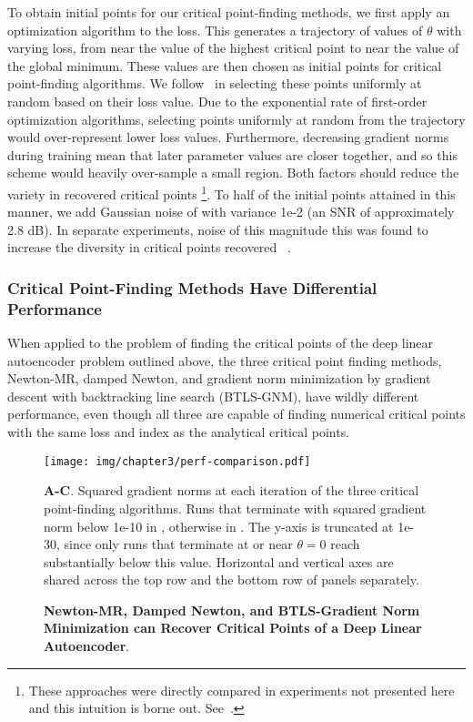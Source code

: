 \documentclass[../../thesis.tex]{subfiles}
\begin{document}
To obtain initial points for our critical point-finding methods,
we first apply an optimization algorithm to the loss.
This generates a trajectory of values of $\theta$ with varying loss,
from near the value of the highest critical point
to near the value of the global minimum.
These values are then chosen as initial points
for critical point-finding algorithms.
We follow~\cite{pennington2017} in selecting these points
uniformly at random based on their loss value.
Due to the exponential rate of first-order optimization algorithms,
selecting points uniformly at random from the trajectory
would over-represent lower loss values.
Furthermore, decreasing gradient norms during training mean that
later parameter values are closer together,
and so this scheme would heavily over-sample a small region.
Both factors should reduce the variety in recovered critical points%
\footnote{These approaches were directly compared in
experiments not presented here and this intuition is borne out.
See~\cite{frye2019}.}.
To half of the initial points attained in this manner,
we add Gaussian noise of with variance 1e-2
(an SNR of approximately 2.8 dB).
In separate experiments,
noise of this magnitude
this was found to increase
the diversity in critical points recovered%
~\cite{frye2019}.

\subsubsection{Critical Point-Finding Methods Have Differential Performance}%

When applied to the problem of finding the critical points
of the deep linear autoencoder problem outlined above,
the three critical point finding methods,
Newton-MR, damped Newton, and
gradient norm minimization by gradient descent with backtracking line search
(BTLS-GNM),
have wildly different performance,
even though all three are capable of finding numerical critical points
with the same loss and index as the analytical critical points.

\begin{figure}[h]
	\begin{center}
		\texttt{[image: img/chapter3/perf-comparison.pdf]}
	\end{center}
	\caption{\textbf{Newton-MR, Damped Newton, and BTLS-Gradient Norm Minimization
	can Recover Critical Points of a Deep Linear Autoencoder}.}{%
		\textbf{A-C}. Squared gradient norms at each iteration
		of the three critical point-finding algorithms.
		Runs that terminate with squared gradient norm below 1e-10
		in \successcolor{},
		otherwise in \failcolor{}.
		The y-axis is truncated at 1e-30,
		since only runs that terminate at or near $\theta=0$
		reach substantially below this value.
		Horizontal and vertical axes are shared across
		the top row and the bottom row of panels separately.
	}
\end{figure}
\end{document}
